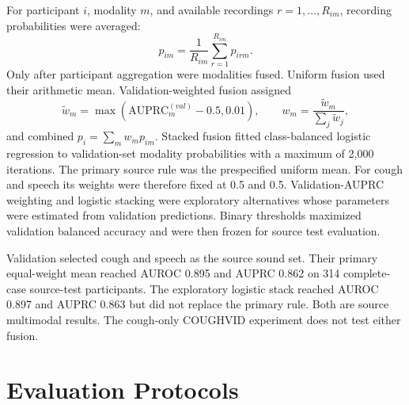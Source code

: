 \documentclass[journal]{IEEEtran}
\newcommand{\auprc}{\mathrm{AUPRC}}
\begin{document}
For participant $i$, modality $m$, and available recordings $r=1,\ldots,R_{im}$, recording probabilities were averaged:
\begin{equation}
p_{im}=\frac{1}{R_{im}}\sum_{r=1}^{R_{im}}p_{irm}.
\end{equation}
Only after participant aggregation were modalities fused. Uniform fusion used their arithmetic mean. Validation-weighted fusion assigned
\begin{equation}
\widetilde w_m=\max\!\left(\auprc_m^{(val)}-0.5,0.01\right),\qquad
w_m=\frac{\widetilde w_m}{\sum_j\widetilde w_j},
\end{equation}
and combined $p_i=\sum_mw_mp_{im}$. Stacked fusion fitted class-balanced logistic regression to validation-set modality probabilities with a maximum of 2,000 iterations. The primary source rule was the prespecified uniform mean. For cough and speech its weights were therefore fixed at 0.5 and 0.5. Validation-AUPRC weighting and logistic stacking were exploratory alternatives whose parameters were estimated from validation predictions. Binary thresholds maximized validation balanced accuracy and were then frozen for source test evaluation.

Validation selected cough and speech as the source sound set. Their primary equal-weight mean reached AUROC 0.895 and AUPRC 0.862 on 314 complete-case source-test participants. The exploratory logistic stack reached AUROC 0.897 and AUPRC 0.863 but did not replace the primary rule. Both are source multimodal results. The cough-only COUGHVID experiment does not test either fusion.

\section{Evaluation Protocols}
\end{document}
